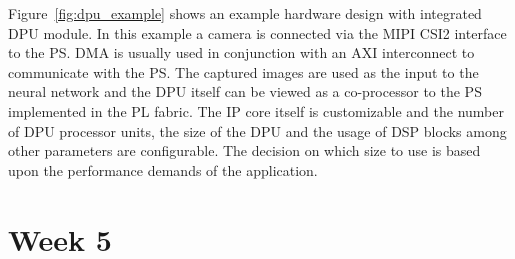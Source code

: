 Figure~\ref{fig:dpu_example} shows an example hardware design with integrated \ac{DPU} module. In this example a camera is connected via the \ac{MIPI} \ac{CSI2} interface to the \ac{PS}. \ac{DMA} is usually used in conjunction with an \ac{AXI} interconnect to communicate with the \ac{PS}. The captured images are used as the input to the neural network and the \ac{DPU} itself can be viewed as a co-processor to the \ac{PS} implemented in the \ac{PL} fabric. The \ac{IP} core itself is customizable and the number of \ac{DPU} processor units, the size of the \ac{DPU} and the usage of \ac{DSP} blocks among other parameters are configurable. The decision on which size to use is based upon the performance demands of the application.

\section{Week 5}
